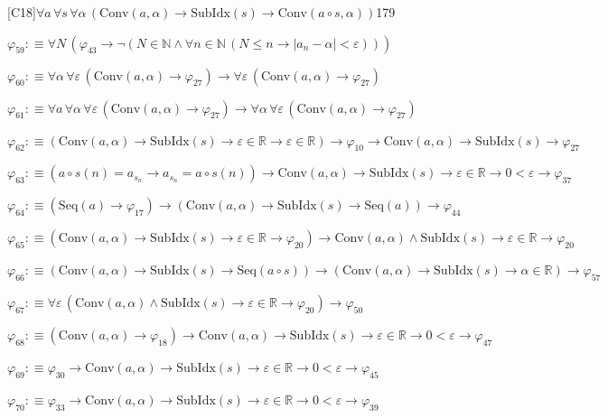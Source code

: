 \begin{fullproof}{[C18]}{$\forall a\,\forall s\,\forall \alpha\,(\mathrm{Conv}(a,\alpha) \to \mathrm{SubIdx}(s) \to \mathrm{Conv}(a \circ s,\alpha))$}{179}
\begin{abbrevlist}
\item $\varphi_{59} :\equiv \forall N\,(\varphi_{43} \to \neg (N \in \mathbb{N} \land \forall n \in \mathbb{N}\,(N \leq n \to \lvert a_{n} - \alpha \rvert < \varepsilon)))$
\item $\varphi_{60} :\equiv \forall \alpha\,\forall \varepsilon\,(\mathrm{Conv}(a,\alpha) \to \varphi_{27}) \to \forall \varepsilon\,(\mathrm{Conv}(a,\alpha) \to \varphi_{27})$
\item $\varphi_{61} :\equiv \forall a\,\forall \alpha\,\forall \varepsilon\,(\mathrm{Conv}(a,\alpha) \to \varphi_{27}) \to \forall \alpha\,\forall \varepsilon\,(\mathrm{Conv}(a,\alpha) \to \varphi_{27})$
\item $\varphi_{62} :\equiv (\mathrm{Conv}(a,\alpha) \to \mathrm{SubIdx}(s) \to \varepsilon \in \mathbb{R} \to \varepsilon \in \mathbb{R}) \to \varphi_{10} \to \mathrm{Conv}(a,\alpha) \to \mathrm{SubIdx}(s) \to \varphi_{27}$
\item $\varphi_{63} :\equiv (a \circ s(n) = a_{s_{n}} \to a_{s_{n}} = a \circ s(n)) \to \mathrm{Conv}(a,\alpha) \to \mathrm{SubIdx}(s) \to \varepsilon \in \mathbb{R} \to 0 < \varepsilon \to \varphi_{37}$
\item $\varphi_{64} :\equiv (\mathrm{Seq}(a) \to \varphi_{17}) \to (\mathrm{Conv}(a,\alpha) \to \mathrm{SubIdx}(s) \to \mathrm{Seq}(a)) \to \varphi_{44}$
\item $\varphi_{65} :\equiv (\mathrm{Conv}(a,\alpha) \to \mathrm{SubIdx}(s) \to \varepsilon \in \mathbb{R} \to \varphi_{20}) \to \mathrm{Conv}(a,\alpha) \land \mathrm{SubIdx}(s) \to \varepsilon \in \mathbb{R} \to \varphi_{20}$
\item $\varphi_{66} :\equiv (\mathrm{Conv}(a,\alpha) \to \mathrm{SubIdx}(s) \to \mathrm{Seq}(a \circ s)) \to (\mathrm{Conv}(a,\alpha) \to \mathrm{SubIdx}(s) \to \alpha \in \mathbb{R}) \to \varphi_{57}$
\item $\varphi_{67} :\equiv \forall \varepsilon\,(\mathrm{Conv}(a,\alpha) \land \mathrm{SubIdx}(s) \to \varepsilon \in \mathbb{R} \to \varphi_{20}) \to \varphi_{50}$
\item $\varphi_{68} :\equiv (\mathrm{Conv}(a,\alpha) \to \varphi_{18}) \to \mathrm{Conv}(a,\alpha) \to \mathrm{SubIdx}(s) \to \varepsilon \in \mathbb{R} \to 0 < \varepsilon \to \varphi_{47}$
\item $\varphi_{69} :\equiv \varphi_{30} \to \mathrm{Conv}(a,\alpha) \to \mathrm{SubIdx}(s) \to \varepsilon \in \mathbb{R} \to 0 < \varepsilon \to \varphi_{45}$
\item $\varphi_{70} :\equiv \varphi_{33} \to \mathrm{Conv}(a,\alpha) \to \mathrm{SubIdx}(s) \to \varepsilon \in \mathbb{R} \to 0 < \varepsilon \to \varphi_{39}$

\end{abbrevlist}
\end{fullproof}
